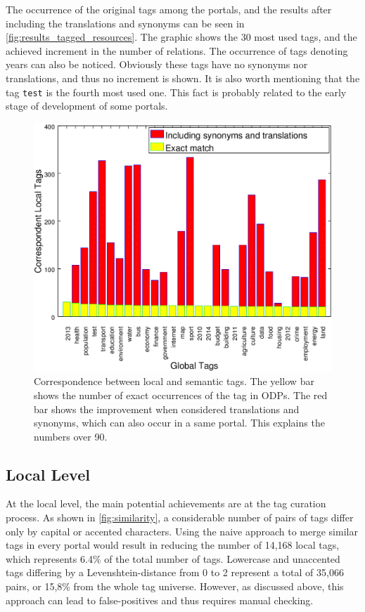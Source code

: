 The occurrence of the original tags among the portals, and the results after including the translations and synonyms can be seen in \autoref{fig:results_tagged_resources}. 
The graphic shows the 30 most used tags, and the achieved increment in the number of relations. 
The occurrence of tags denoting years can also be noticed.
Obviously these tags have no synonyms nor translations, and thus no increment is shown. 
It is also worth mentioning that the tag \texttt{{test}} is the fourth most used one.
This fact is probably related to the early stage of development of some portals. 

\begin{figure}[tb]
\begin{center}
\includegraphics[width=\columnwidth]{images/results_tagged_resources.png}
\caption[Correspondence between local and semantic tags.]{Correspondence between local and semantic tags. The yellow bar shows the number of exact occurrences of the tag in ODPs. The red bar shows the improvement when considered translations and synonyms, which can also occur in a same portal. This explains the numbers over 90. }
\label{fig:results_tagged_resources}
\end{center}
\end{figure}

\subsection{Local Level}

At the local level, the main potential achievements are at the tag curation process.
As shown in \autoref{fig:similarity}, a considerable number of pairs of tags differ only by capital or accented characters.
Using the naive approach to merge similar tags in every portal would result in reducing the number of 14,168 local tags, which represents 6.4\% of the total number of tags.
Lowercase and unaccented tags differing by a Levenshtein-distance from 0 to 2 represent a total of 35,066 pairs, or 15,8\% from the whole tag universe.
However, as discussed above, this approach can lead to false-positives and thus requires manual checking.


